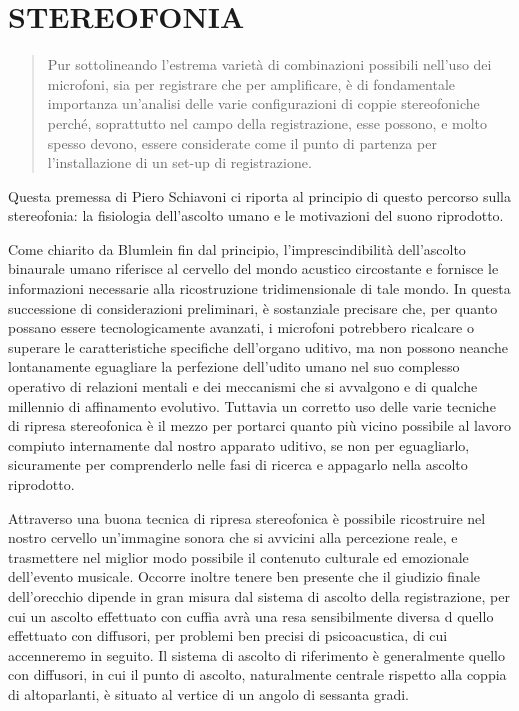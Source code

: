 \section*{STEREOFONIA}
\begin{quote}
Pur sottolineando l’estrema varietà di combinazioni possibili nell’uso dei
microfoni, sia per registrare che per amplificare, è di fondamentale importanza
un’analisi delle varie configurazioni di coppie stereofoniche perché,
soprattutto nel campo della registrazione, esse possono, e molto spesso devono,
essere considerate come il punto di partenza per l’installazione di un set-up
di registrazione.
\end{quote}

Questa premessa di Piero Schiavoni ci riporta al principio di questo percorso
sulla stereofonia: la fisiologia dell'ascolto umano e le motivazioni del suono
riprodotto.

Come chiarito da Blumlein \cite{ab58} fin dal principio, l'imprescindibilità
dell'ascolto binaurale umano riferisce al cervello del mondo acustico circostante
e fornisce le informazioni necessarie alla ricostruzione tridimensionale di tale
mondo. In questa successione di considerazioni preliminari, è sostanziale
precisare che, per quanto possano essere tecnologicamente avanzati, i microfoni
potrebbero ricalcare o superare le caratteristiche specifiche dell'organo uditivo,
ma non possono neanche lontanamente eguagliare la perfezione dell’udito umano
nel suo complesso operativo di relazioni mentali e dei meccanismi che si
avvalgono e di qualche millennio di affinamento evolutivo. Tuttavia un
corretto uso delle varie tecniche di ripresa stereofonica è il mezzo per
portarci quanto più vicino possibile al lavoro compiuto internamente dal nostro
apparato uditivo, se non per eguagliarlo, sicuramente per comprenderlo nelle
fasi di ricerca e appagarlo nella ascolto riprodotto.

Attraverso una buona tecnica di ripresa stereofonica è possibile ricostruire nel
nostro cervello un’immagine sonora che si avvicini alla percezione reale, e
trasmettere nel miglior modo possibile il contenuto culturale ed emozionale
dell’evento musicale. Occorre inoltre tenere ben presente che il giudizio finale
dell’orecchio dipende in gran misura dal sistema di ascolto della registrazione,
per cui un ascolto effettuato con cuffia avrà una resa sensibilmente diversa d
quello effettuato con diffusori, per problemi ben precisi di psicoacustica, di
cui accenneremo in seguito. Il sistema di ascolto di riferimento è generalmente
quello con diffusori, in cui il punto di ascolto, naturalmente centrale rispetto
alla coppia di altoparlanti, è situato al vertice di un angolo di sessanta gradi.

